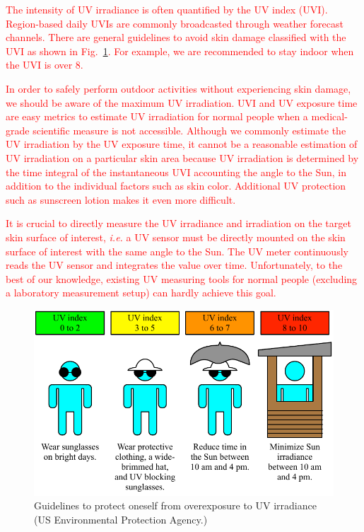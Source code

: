 \documentclass[journal]{IEEEtran}
\begin{document}
\textcolor{red}{The intensity of UV irradiance is often quantified by the UV index (UVI). Region-based daily UVIs are commonly broadcasted through weather forecast channels. There are general guidelines to avoid skin damage classified with the UVI as shown in Fig.~\ref{fig:guidelines}. For example, we are recommended to stay indoor when the UVI  is over 8.} 

\textcolor{red}{In order to safely perform outdoor activities without experiencing skin damage, we should be aware of  the maximum UV irradiation. UVI and UV exposure time are easy metrics to estimate UV irradiation for normal people when a medical-grade scientific measure is not accessible. Although we commonly estimate the UV irradiation by the UV exposure time, it cannot be a reasonable estimation of UV irradiation on a particular skin area because UV irradiation is determined by the time integral of the instantaneous UVI accounting the angle to the Sun, in addition to the individual factors such as skin color. Additional UV protection such as sunscreen lotion makes it even more difficult.} 

\textcolor{red}{It is crucial to directly measure the UV irradiance and irradiation on the target skin surface of interest, \textit{i.e.} a UV sensor must be directly mounted on the skin surface of interest with the same angle to the Sun. The UV meter continuously reads the UV sensor and integrates the value over time. Unfortunately, to the best of our knowledge, existing UV measuring tools for normal people (excluding a laboratory measurement setup) can hardly achieve this goal.}

\begin{figure}
\centering
\includegraphics[width=1.0\hsize]{Figures/UVI_guideline.pdf}
\caption{Guidelines to protect oneself from overexposure to UV irradiance (US Environmental Protection Agency.)}
\label{fig:guidelines}
\end{figure}
\end{document}
